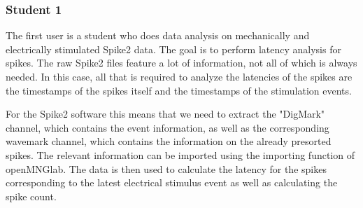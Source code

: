 \subsubsection{Student 1}

The first user is a student who does data analysis on mechanically and electrically stimulated Spike2 data. The goal is to perform latency analysis for spikes. The raw Spike2 files feature a lot of information, not all of which is always needed. In this case, all that is required to analyze the latencies of the spikes are the timestamps of the spikes itself and the timestamps of the stimulation events. 

For the Spike2 software this means that we need to extract the "DigMark" channel, which contains the event information, as well as the corresponding wavemark channel, which contains the information on the already presorted spikes. The relevant information can be imported using the importing function of openMNGlab. The data is then used to calculate the latency for the spikes corresponding to the latest electrical stimulus event as well as calculating the spike count.

